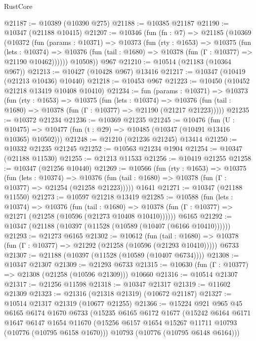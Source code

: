 \begin{lexlean}{RustCore}
\begin{coremodule}
@21187 := @10389 (@10390 @275)
@21188 := @10385 @21187
@21190 := @10347 (@21188 @10415)
@21207 := @10346
    (fun (fn : @7) =>
    @21185
      (@10369
        (@10372
          (fun (params : @10371) =>
          @10373
            (fun (rty : @1653) =>
            @10375
              (fun (lets : @10374) =>
              @10376 (fun (tail : @1680) => @10378 (fun (Γ : @10377) => @21190 @10462))))))
        @10508))
    @967
@21210 := @10514 (@21183 (@10364 @967))
@21213 := @10427 (@10428 @967) @13416
@21217 := @10347 (@10419 (@21213 @10436) @10440)
@21218 := @10453 @967
@21223 := @10450 (@10452 @21218 @13419 @10408 @10410)
@21234 := fun (params : @10371) =>
  @10373
    (fun (rty : @1653) =>
    @10375
      (fun (lets : @10374) =>
      @10376 (fun (tail : @1680) => @10378 (fun (Γ : @10377) => @21190 (@21217 @21223)))))
@21235 := @10372 @21234
@21236 := @10369 @21235
@21245 := @10476
    (fun (U : @10475) => @10477 (fun (t : @29) => @10485 (@10347 (@10491 @13416 @10365) @10502)))
@21248 := @21210 (@21236 @21245) @13414
@21250 := @10332 @21235 @21245
@21252 := @10563 @21234 @1904
@21254 := @10347 (@21188 @11530)
@21255 := @21213 @11533
@21256 := @10419 @21255
@21258 := @10347 (@21256 @10440)
@21269 := @10566
    (fun (rty : @1653) =>
    @10375
      (fun (lets : @10374) =>
      @10376 (fun (tail : @1680) => @10378 (fun (Γ : @10377) => @21254 (@21258 @21223)))))
    @1641
@21271 := @10347 (@21188 @11550)
@21273 := @10597 @21218 @13419
@21285 := @10588
    (fun (lets : @10374) =>
    @10376
      (fun (tail : @1680) =>
      @10378 (fun (Γ : @10377) => @21271 (@21258 (@10596 (@21273 @10408 @10410))))))
    @6165
@21292 := @10347 (@21188 (@10397 (@11528 (@10589 (@10407 (@6166 @10410))))))
@21293 := @21273 @6165
@21302 := @10612
    (fun (tail : @1680) => @10378 (fun (Γ : @10377) => @21292 (@21258 (@10596 (@21293 @10410)))))
    @6733
@21307 := @21188 (@10397 (@11528 (@10589 (@10407 @6734))))
@21308 := @10347 @21307
@21309 := @21293 @6733
@21315 := @10630 (fun (Γ : @10377) => @21308 (@21258 (@10596 @21309))) @10660
@21316 := @10514 @21307
@21317 := @21256 @11598
@21318 := @10347 @21317
@21319 := @11602 @21309
@21323 := @21316 (@21318 @21319) (@10672 @21187)
@21327 := @10514 @21317 @21319 (@10677 @21255)
@21366 := @15224
    @921
    @965
    @45
    @6165
    @6174
    @1670
    @6733
    (@15235
      @6165
      @6172
      @1677
      (@15242
        @6164
        @6171
        @1647
        @6147
        @1654
        @11670
        (@15256 @6157 @1654 @15267 @11711 @10793 (@10776 (@10795 @6158 @1670)))
        @10793
        (@10776 (@10795 @6148 @6164)))

\end{coremodule}
\end{lexlean}
